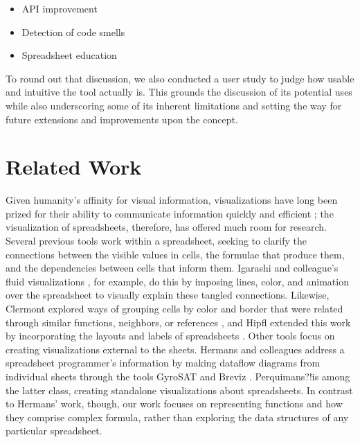 \documentclass[conference]{IEEEtran}
\newcommand{\toolname}{Perquimans?!}
\begin{document}
	\begin{itemize}
		\item API improvement
		\item Detection of code smells
		\item Spreadsheet education
	\end{itemize}
	
	To round out that discussion, we also conducted a user study to judge how usable 
	and intuitive the tool actually is. This grounds the discussion of its potential uses
	while also underscoring some of its inherent limitations and setting the way
	for future extensions and improvements upon the concept.
	
	\section{Related Work} Given humanity's affinity for visual information,
	visualizations have long been prized for their ability to communicate
	information quickly and efficient \cite{baeza1999modern}; the visualization of
	spreadsheets, therefore, has offered much room for research. Several previous
	tools work within a spreadsheet, seeking to clarify the connections between the
	visible values in cells, the formulae that produce them, and the dependencies
	between cells that inform them. Igarashi and colleague's fluid visualizations
	\cite{igarashi1998fluid}, for example, do this by imposing lines, color, and
	animation over the spreadsheet to visually explain these tangled connections.
	Likewise, Clermont explored ways of grouping cells by color and border that
	were related through similar functions, neighbors, or references
	\cite{clermont2003scalable}, and Hipfl extended this work by incorporating the
	layouts and labels of spreadsheets \cite{hipfl2008using}. Other tools focus on
	creating visualizations external to the sheets. Hermans and colleagues address a
	spreadsheet programmer's information by making dataflow diagrams from individual sheets
	through the tools GyroSAT \cite{hermans2011supporting} and Breviz \cite{hermans2011breviz}. 
	\toolname is among the latter class, creating standalone visualizations about spreadsheets. In contrast to Hermans' work, though, our work focuses on representing
	functions and how they comprise complex formula, rather than exploring the data
	structures of any particular spreadsheet.  \par
	
\end{document}
